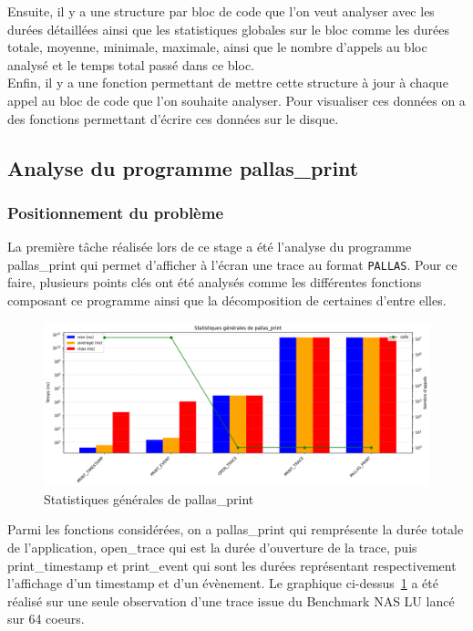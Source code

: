 Ensuite, il y a une structure par bloc de code que l'on veut analyser avec les durées détaillées ainsi que les statistiques globales sur le bloc comme les durées totale, moyenne, minimale, maximale, ainsi que 
le nombre d'appels au bloc analysé et le temps total passé dans ce bloc.\\

Enfin, il y a une fonction permettant de mettre cette structure à jour à chaque appel au bloc de code que l'on souhaite analyser.\newline
Pour visualiser ces données on a des fonctions permettant d'écrire ces données sur le disque.

\subsection{Analyse du programme pallas\_print}\label{ssec:pallas_print}
\subsubsection{Positionnement du problème}\label{ssec:pallas_print_pbm}

La première tâche réalisée lors de ce stage a été l'analyse du programme pallas\_print qui permet d'afficher à l'écran une trace au format \verb!PALLAS!.
Pour ce faire, plusieurs points clés ont été analysés comme les différentes fonctions composant ce programme ainsi que la décomposition de certaines d'entre elles.

\begin{figure}[!h]
    \centering
    \includegraphics[width=1\textwidth]{img/pallas_print_gen.png}
    \caption{Statistiques générales de pallas\_print}
    \label{fig:pallas_print}
\end{figure}

Parmi les fonctions considérées, on a pallas\_print qui remprésente la durée totale de l'application, open\_trace qui est la durée d'ouverture de la trace,
puis print\_timestamp et print\_event qui sont les durées représentant respectivement l'affichage d'un timestamp et d'un évènement.
Le graphique ci-dessus~\ref{fig:pallas_print} a été réalisé sur une seule observation d'une trace issue du Benchmark NAS LU lancé sur 64 coeurs.

